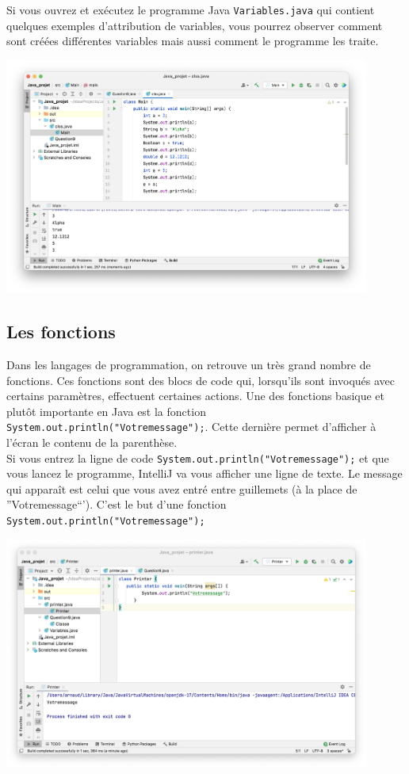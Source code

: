 Si vous ouvrez et exécutez le programme Java \lstinline{Variables.java} qui contient quelques exemples d'attribution de variables, vous pourrez observer comment sont créées différentes variables mais aussi comment le programme les traite.
\begin{center}
	\includegraphics[width=12cm]{8j}	
\end{center}

\subsection{Les fonctions}

Dans les langages de programmation, on retrouve un très grand nombre de fonctions. Ces fonctions sont des blocs de code qui, lorsqu'ils sont invoqués avec certains paramètres, effectuent certaines actions. Une des fonctions basique et plutôt importante en Java est la fonction \lstinline{System.out.println("Votremessage");}.  Cette dernière permet d'afficher à l'écran le contenu de la parenthèse.\\ 
Si vous entrez la ligne de code \lstinline{System.out.println("Votremessage");} et que vous lancez le programme, IntelliJ va vous afficher une ligne de texte. Le message qui apparaît est celui que vous avez entré entre guillemets (à la place de ''Votremessage``'). C'est le but d'une fonction \lstinline{System.out.println("Votremessage");}
\begin{center}
\includegraphics[width=12cm]{9j}	
\end{center}


